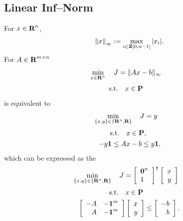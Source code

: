 \documentclass{article}
\begin{document}
\subsection{Linear Inf--Norm}

    For $x\in\textbf{R}^n$,
    \begin{align*}
        \left\| x \right\|_\infty := \max_{i\in\textbf{Z}[0,n-1]} |x_i|.
    \end{align*}
    For $A\in\textbf{R}^{m\times n}$
        \begin{align*}
            \min_{x\in\textbf{R}^n}\quad J &= \|A x-b\|_\infty
        \end{align*}
        \begin{align*}
            \text{s.t.}\quad &x\in\textbf{P}
        \end{align*}
    is equivalent to 
    \cite[p.~294]{bv_cvxbook}
    \begin{align*}
        \min_{\{x,y\}\in\{\textbf{R}^n,\textbf{R}\}}\quad J&= y
    \end{align*}
    \begin{align*}
        \text{s.t.}\quad &x\in\textbf{P},
        \\
        -y \textbf{1}\leq A &x-b \leq y \textbf{1},
    \end{align*}
    which can be expressed as the \LP
    \begin{align*}
        \min_{\{x,y\}\in\{\textbf{R}^n,\textbf{R}\}}
        \quad J&=   \left[\begin{array}{l}
                            \textbf{0}^{n}  \\   1
                        \end{array}\right]^\intercal
                        \left[\begin{array}{r}
                            x   \\
                            y
                        \end{array}\right]
    \end{align*}
    \begin{align*}
        \text{s.t.}\quad &x\in\textbf{P}\\
            \left[\begin{array}{rr}
                        -A  &   -\textbf{1}^{m}   \\
                        A   &   -\textbf{1}^{m} 
                    \end{array}\right]&
                    \left[\begin{array}{r}
                    x\\
                    y
                    \end{array}\right]
                \leq
                    \left[\begin{array}{r}
                        -b  \\
                        b
                    \end{array}\right].
    \end{align*}
\end{document}
